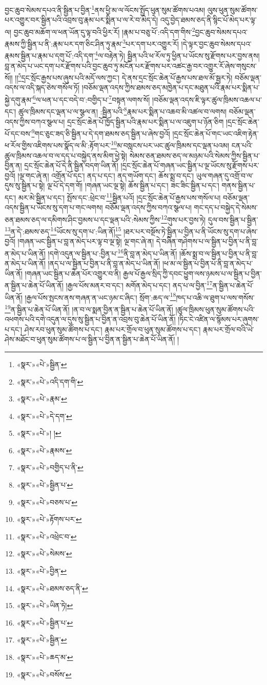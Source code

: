 བྱང་ཆུབ་སེམས་དཔའ་ནི་སྦྱིན་པ་བྱིན་\footnote{«སྣར་»«པེ་»སྦྱིན་}ནས་ཕྱི་མ་ལ་ལོངས་སྤྱོད་ཕུན་སུམ་ཚོགས་པའམ། ལུས་ཕུན་སུམ་ཚོགས་པར་འགྱུར་བར་སྦྱིན་པའི་འབྲས་བུ་རྣམ་པར་སྨིན་པ་ལ་རེ་བ་མེད་དེ། འདུ་བྱེད་ཐམས་ཅད་ནི་སྙིང་པོ་མེད་པར་ལྟ་ལ། བྱང་ཆུབ་མཆོག་ལ་ཕན་ཡོན་དུ་ལྟ་བའི་ཕྱིར་རོ། །རྣམ་པ་བཅུ་པོ་:འདི་དག་གིས་\footnote{«སྣར་»«པེ་»འདི་དག་གི་}བྱང་ཆུབ་སེམས་དཔའ་རྣམས་ཀྱི་སྦྱིན་པ་ནི་:རྣམ་པར་དག་ཅིང་ཤིན་ཏུ་རྣམ་\footnote{«སྣར་»«པེ་»རྣམ་}པར་དག་པར་འགྱུར་རོ། །དེ་ལྟར་བྱང་ཆུབ་སེམས་དཔའ་རྣམས་སྦྱིན་པ་རྣམ་པ་དགུ་པོ་:འདི་དག་\footnote{«སྣར་»«པེ་»དེ་དག་}ལ་བརྟེན་ཏེ། སྦྱིན་པའི་ཕ་རོལ་ཏུ་ཕྱིན་པ་ཡོངས་སུ་རྫོགས་པར་བྱས་ནས། བླ་ན་མེད་པ་ཡང་དག་པར་རྫོགས་པའི་བྱང་ཆུབ་ཏུ་མངོན་པར་རྫོགས་པར་འཚང་རྒྱ་བར་འགྱུར་རོ་ཞེས་གསུངས་སོ།། །།\footnote{«སྣར་»«པེ་»། །}དྲང་སྲོང་རྒྱས་པས་ཞུས་པའི་མདོ་ལས་ཀྱང་། དེ་ནས་དྲང་སྲོང་ཆེན་པོ་རྒྱས་པས་ཐལ་མོ་སྦྱར་ཏེ། བཅོམ་ལྡན་འདས་ལ་འདི་སྐད་ཅེས་གསོལ་ཏོ། །བཅོམ་ལྡན་འདས་ཀྱིས་ཐམས་ཅད་མཁྱེན་པ་དང་མཐུན་པའི་རྣམ་པར་སྨིན་པ་སྐྱེ་དགུ་རྣམ་\footnote{«སྣར་»«པེ་»རྣམས་}ལ་ཕན་པ་དང་བདེ་བ་:བགྱིད་པ་\footnote{«སྣར་»«པེ་»བགྱིད་པ་ནི་}བསྟན་ལགས་སོ། །བཅོམ་ལྡན་འདས་ཇི་ལྟར་ཚུལ་ཁྲིམས་འཆལ་པ་དང་། ཚུལ་ཁྲིམས་དང་ལྡན་པ་ལ་སྩལ་ན། :སྦྱིན་པའི་\footnote{«སྣར་»«པེ་»སྦྱིན་པ་}རྣམ་པར་སྨིན་པ་འཆབ་མི་འཚལ་བ་ལགས། བཅོམ་ལྡན་འདས་ཀྱིས་བཀའ་སྩལ་པ། དྲང་སྲོང་ཆེན་པོ་ཁྱོད་སྦྱིན་པའི་རྣམ་པར་སྨིན་པ་ལ་འཇུག་པ་ཉོན་ཅིག །དྲང་སྲོང་ཆེན་པོ་དང་བས་\footnote{«སྣར་»«པེ་»བཅས་པ་}གང་ཅུང་ཟད་ཅི་སྦྱིན་པ་དེ་དག་ཐམས་ཅད་སྦྱིན་པ་ཞེས་བྱའོ། །དྲང་སྲོང་ཆེན་པོ་གང་ཡང་འཇིག་རྟེན་ཕ་རོལ་གྱིས་འཇིགས་པས་སྣོད་ལ་མི་:རྟོག་པར་\footnote{«སྣར་»«པེ་»རྟོགས་པར་}མ་བསླངས་པར་ཡང་ཚུལ་ཁྲིམས་དང་ལྡན་པའམ། ངན་པའི་ཚུལ་ཁྲིམས་འཆལ་བ་ལ་དད་པ་བསྐྱེད་ནས་མིག་ཕྱེ་སྟེ། སེམས་ཅན་ཐམས་ཅད་ལ་མཉམ་པའི་སེམས་ཀྱིས་སྦྱིན་པ་བྱིན་ན། དྲང་སྲོང་ཆེན་པོ་དེ་ནི་སྦྱིན་བདག་ཡིན་ནོ། །དྲང་སྲོང་ཆེན་པོ་གཞན་ཡང་སྦྱིན་པ་ལྔ་ཡོངས་སུ་རྫོགས་པར་བྱའོ། །ལྔ་གང་ཞེ་ན། འགྲོན་པོ་དང་། ནད་པ་དང་། ནད་གཡོག་དང་། ཆོས་སྨྲ་བ་དང་། ཡུལ་གཞན་དུ་འགྲོ་བ་ལ་དུས་སུ་སྦྱིན་པ་སྟེ། ལྔ་པོ་དེ་དག་གོ། །གཞན་ཡང་ལྔ་སྟེ། ཆོས་སྦྱིན་པ་དང་། ཟང་ཟིང་སྦྱིན་པ་དང་། གནས་སྦྱིན་པ་དང་། མར་མེ་སྦྱིན་པ་དང་། སྤོས་དང་:ཕྲེང་བ་\footnote{«སྣར་»«པེ་»འཕྲེང་བ་}སྦྱིན་པའོ། །དྲང་སྲོང་ཆེན་པོ་རྒྱས་པས་གསོལ་པ། བཅོམ་ལྡན་འདས་སྦྱིན་པ་ཡོངས་སུ་དག་པ་གང་ལགས། བཅོམ་ལྡན་འདས་ཀྱིས་བཀའ་སྩལ་པ། གང་དད་པ་བསྐྱེད་དེ་སེམས་ཅན་ཐམས་ཅད་ལ་དམིགས་ཤིང་བྱམས་པ་དང་ལྡན་པའི་:སེམས་ཀྱིས་\footnote{«སྣར་»«པེ་»སེམས་}གུས་པར་བྱས་ཏེ། དུལ་བས་སྦྱིན་པ་སྦྱིན་\footnote{«སྣར་»«པེ་»བྱིན་}ན་དེ་:ཐམས་ཅད་\footnote{«སྣར་»«པེ་»ཐམས་ཅད་ནི་}ཡོངས་སུ་དག་པ་:ཡིན་ནོ།\footnote{«སྣར་»«པེ་»ཡིན་ཏེ།} །ཐར་པར་བསྔོས་ཏེ་སྦྱིན་པ་བྱིན་པ་ནི་ཡོངས་སུ་དག་པ་ཞེས་བྱའོ། །གཞན་ཡང་སྦྱིན་པ་བླ་ན་མེད་པར་ལྟ་བ་ལྔ་སྟེ། ལྔ་གང་ཞེ་ན། དེ་བཞིན་གཤེགས་པ་ལ་སྦྱིན་པ་བྱིན་པ་ནི་བླ་ན་མེད་པ་ཡིན་ནོ། །དགེ་འདུན་ལ་སྦྱིན་པ་:བྱིན་པ་\footnote{«སྣར་»«པེ་»སྦྱིན་པ་}ནི་བླ་ན་མེད་པ་ཡིན་ནོ། །ཆོས་སྨྲ་བ་ལ་སྦྱིན་པ་བྱིན་པ་ནི་བླ་ན་མེད་པ་ཡིན་ནོ། །ནད་པ་ལ་སྦྱིན་པ་བྱིན་པ་ནི་བླ་ན་མེད་པ་ཡིན་ནོ། །ཕ་མ་ལ་སྦྱིན་པ་བྱིན་པ་ནི་བླ་ན་མེད་པ་ཡིན་ནོ། །གཞན་ཡང་སྦྱིན་པ་ཆེན་པོར་འགྱུར་བ་ནི། རྒྱལ་པོ་རྒྱལ་སྲིད་ཀྱི་དབང་ཕྱུག་ལས་ཉམས་པ་ལ་སྦྱིན་པ་བྱིན་ན་སྦྱིན་པ་ཆེན་པོ་ཡིན་ནོ། །རྒྱལ་པོས་མནར་བ་དང་། མགོན་མེད་པ་དང་། ནད་པ་ལ་བྱིན་\footnote{«སྣར་»«པེ་»སྦྱིན་}ན་སྦྱིན་པ་ཆེན་པོ་ཡིན་ནོ། །རྒྱལ་པོས་སྤངས་ནས་གཞན་ན་ཡང་ཉམ་ང་ཞིང་། སྲོག་:ཆད་ལ་\footnote{«སྣར་»«པེ་»ཆད་མ་}ཁད་པ་འཆི་ལ་ཐུག་པ་ལས་གསོས་\footnote{«སྣར་»«པེ་»བསོས་}ན་སྦྱིན་པ་ཆེན་པོ་ཡིན་ནོ། །ན་བ་ལ་སྨན་བྱིན་ན་སྦྱིན་པ་ཆེན་པོ་ཡིན་ནོ། །ཚུལ་ཁྲིམས་ཕུན་སུམ་ཚོགས་པའི་འཕགས་པའི་དགེ་འདུན་ལ་དུས་སུ་སྦྱིན་པ་བྱིན་ན་འབྲས་བུ་ཆེན་པོ་ཡིན་ནོ། །ཏིང་ངེ་འཛིན་ལ་སྙོམས་པར་ཞུགས་པ་དང་། ཤེས་རབ་ཕུན་སུམ་ཚོགས་པ་དང་། རྣམ་པར་གྲོལ་བ་ཕུན་སུམ་ཚོགས་པ་དང་། རྣམ་པར་གྲོལ་བའི་ཡེ་ཤེས་མཐོང་བ་ཕུན་སུམ་ཚོགས་པ་ལ་སྦྱིན་པ་བྱིན་ན་སྦྱིན་པ་ཆེན་པོ་ཡིན་ནོ། །
